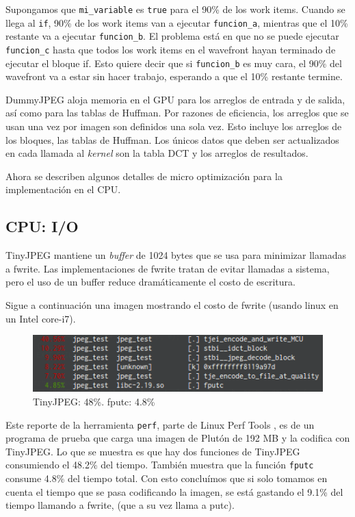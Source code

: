Supongamos que \verb+mi_variable+ es \verb+true+ para el 90\% de los work
items.  Cuando se llega al \verb+if+, 90\% de los work items van a ejecutar
\verb+funcion_a+, mientras que el 10\% restante va a ejecutar \verb+funcion_b+.
El problema está en que no se puede ejecutar \verb+funcion_c+ hasta que todos
los work items en el wavefront hayan terminado de ejecutar el bloque if. Esto
quiere decir que si \verb+funcion_b+ es muy cara, el 90\% del wavefront va a
estar sin hacer trabajo, esperando a que el 10\% restante termine.

DummyJPEG aloja memoria en el GPU para los arreglos de entrada y de salida, así
como para las tablas de Huffman. Por razones de eficiencia, los arreglos que se
usan una vez por imagen son definidos una sola vez. Esto incluye los arreglos
de los bloques, las tablas de Huffman. Los únicos datos que deben ser
actualizados en cada llamada al \emph{kernel} son la tabla DCT y los arreglos
de resultados.

Ahora se describen algunos detalles de micro optimización para la
implementación en el CPU.

\subsection{CPU: I/O} \label{sub:cpu-io}

TinyJPEG mantiene un \emph{buffer} de 1024 bytes que se usa para minimizar
llamadas a fwrite. Las implementaciones de fwrite tratan de evitar llamadas a
sistema, pero el uso de un buffer reduce dramáticamente el costo de escritura.

Sigue a continuación una imagen mostrando el costo de fwrite (usando linux en
un Intel core-i7).

\begin{figure}[hb]
    \includegraphics[width=4.5625in]{fputc}
    \caption{TinyJPEG: 48\%. fputc: 4.8\%}
\end{figure}

Este reporte de la herramienta \verb+perf+, parte de Linux Perf Tools
\cite{linux-perf-tools}, es de un programa de prueba que carga una imagen de
Plutón de 192 MB y la codifica con TinyJPEG. Lo que se muestra es que hay dos
funciones de TinyJPEG consumiendo el 48.2\% del tiempo. También muestra que la
función \verb+fputc+ consume 4.8\% del tiempo total. Con esto concluímos que si
solo tomamos en cuenta el tiempo que se pasa codificando la imagen, se está
gastando el 9.1\% del tiempo llamando a fwrite, (que a su vez llama a putc).

